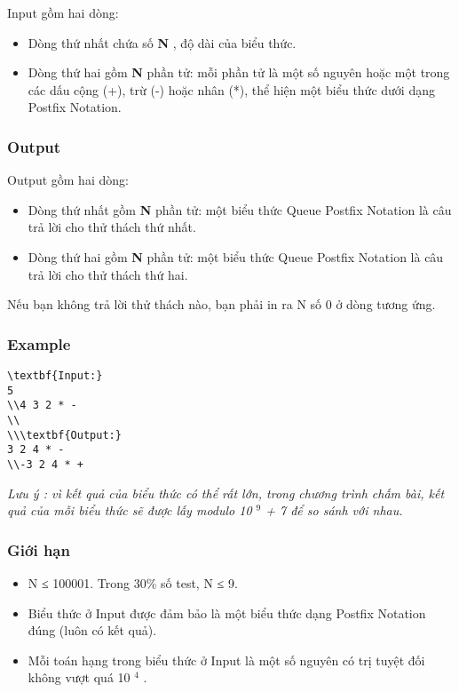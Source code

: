    Input gồm hai dòng:  
\begin{itemize}
	\item     Dòng thứ nhất chứa số    \textbf{     N    }    , độ dài của biểu thức.   
	\item     Dòng thứ hai gồm    \textbf{     N    }    phần tử: mỗi phần tử là một số nguyên hoặc một trong các dấu cộng (+), trừ (-) hoặc nhân (*), thể hiện một biểu thức dưới dạng Postfix Notation.   
\end{itemize}

\subsubsection{   Output  }

   Output gồm hai dòng:  
\begin{itemize}
	\item     Dòng thứ nhất gồm    \textbf{     N    }    phần tử: một biểu thức Queue Postfix Notation là câu trả lời cho thử thách thứ nhất.   
	\item     Dòng thứ hai gồm    \textbf{     N    }    phần tử: một biểu thức Queue Postfix Notation là câu trả lời cho thử thách thứ hai.   
\end{itemize}

   Nếu bạn không trả lời thử thách nào, bạn phải in ra N số 0 ở dòng tương ứng.  

\subsubsection{   Example  }
\begin{verbatim}
\textbf{Input:}
5
\\4 3 2 * -
\\
\\\textbf{Output:}
3 2 4 * -
\\-3 2 4 * + \end{verbatim}

\emph{     Lưu ý        : vì kết quả của biểu thức có thể rất lớn, trong chương trình chấm bài, kết quả của mỗi biểu thức sẽ được lấy modulo 10    $^     9    $    + 7 để so sánh với nhau.   }

\subsubsection{   Giới hạn  }
\begin{itemize}
	\item 

     N ≤ 100001. Trong 30\% số test, N ≤ 9.    
	\item     Biểu thức ở Input được đảm bảo là một biểu thức dạng Postfix Notation đúng (luôn có kết quả).   
	\item     Mỗi toán hạng trong biểu thức ở Input là một số nguyên có trị tuyệt đối không vượt quá 10    $^     4    $    .   
\end{itemize}

